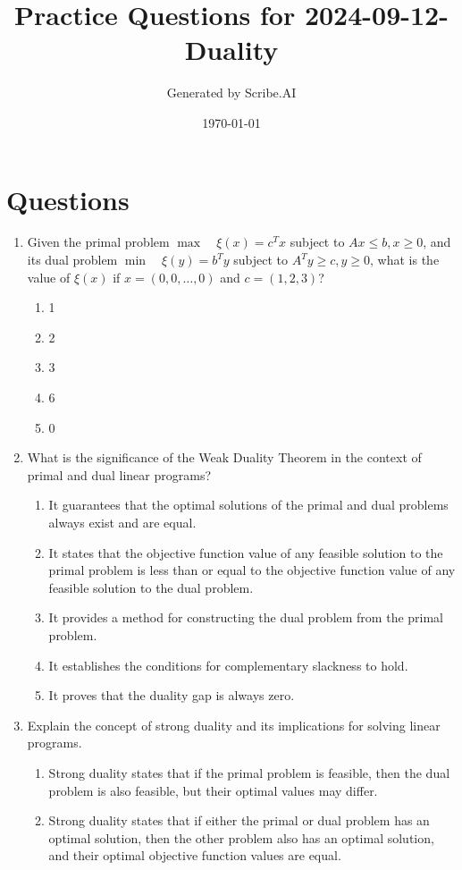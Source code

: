 \documentclass{article}%
\title{Practice Questions for 2024{-}09{-}12{-}Duality}%
\author{Generated by Scribe.AI}%
\date{\today}%
\begin{document}
%
\normalsize%
\maketitle%
\section{Questions}%
\label{sec:Questions}%
\begin{enumerate}%
\item Given the primal problem $\max \quad \xi(x) = c^T x$ subject to $Ax \leq b, x \geq 0$, and its dual problem $\min \quad \xi(y) = b^T y$ subject to $A^T y \geq c, y \geq 0$, what is the value of $\xi(x)$ if $x = (0, 0, \dots, 0)$ and $c = (1, 2, 3)$?%
\begin{enumerate}%
\item 1%
\item 2%
\item 3%
\item 6%
\item 0%
\end{enumerate}%
\vspace{1em}%
\item What is the significance of the Weak Duality Theorem in the context of primal and dual linear programs?%
\begin{enumerate}%
\item It guarantees that the optimal solutions of the primal and dual problems always exist and are equal.%
\item It states that the objective function value of any feasible solution to the primal problem is less than or equal to the objective function value of any feasible solution to the dual problem.%
\item It provides a method for constructing the dual problem from the primal problem.%
\item It establishes the conditions for complementary slackness to hold.%
\item It proves that the duality gap is always zero.%
\end{enumerate}%
\vspace{1em}%
\item Explain the concept of strong duality and its implications for solving linear programs.%
\begin{enumerate}%
\item Strong duality states that if the primal problem is feasible, then the dual problem is also feasible, but their optimal values may differ.%
\item Strong duality states that if either the primal or dual problem has an optimal solution, then the other problem also has an optimal solution, and their optimal objective function values are equal.%

\end{enumerate}
\end{enumerate}
\end{document}
